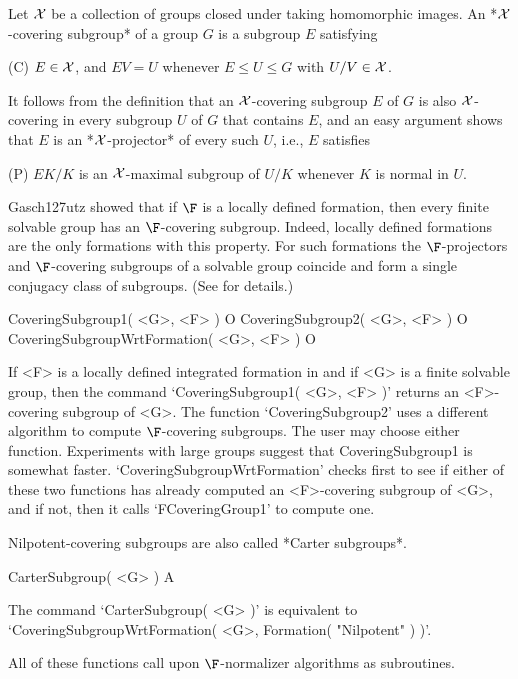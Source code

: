 
\def\X{{\cal{X}}}


Let $\X$ be a collection of groups closed under taking homomorphic images.
An *$\X$-covering subgroup* of a group $G$ is a subgroup $E$ satisfying

(C) \qquad $E \in \X$, and $EV = U$ whenever $E \le U \le G$ with $U/V \in
\X$.

It follows from the definition that an $\X$-covering subgroup $E$ of $G$ is
also $\X$-covering in every subgroup $U$ of $G$ that contains $E$, and an
easy argument shows that $E$ is an *$\X$-projector* of every such $U$,
i.e., $E$ satisfies

(P) \qquad $EK/K$ is an $\X$-maximal subgroup of $U/K$ whenever $K$ is
normal in $U$.

Gasch{\accent127u}tz showed that if $\F$ is a locally defined formation,
then every finite solvable group has an $\F$-covering subgroup. Indeed,
locally defined formations are the only formations with this property. For
such formations the $\F$-projectors and $\F$-covering subgroups of a
solvable group coincide and form a single conjugacy class of subgroups.
(See \cite{DH} for details.)

\> CoveringSubgroup1( <G>, <F> ) O
\> CoveringSubgroup2( <G>, <F> ) O
\> CoveringSubgroupWrtFormation( <G>, <F> ) O

If <F> is a locally defined integrated formation in {\GAP} and if <G> is
a finite solvable group, then the command `CoveringSubgroup1( <G>, <F> )'
returns an <F>-covering subgroup of <G>.
The function `CoveringSubgroup2' uses a different algorithm to compute
$\F$-covering subgroups. The user may choose either function. Experiments with large groups suggest that CoveringSubgroup1 is somewhat faster.
`CoveringSubgroupWrtFormation' checks first to see if either of these
two functions has already computed an <F>-covering subgroup of <G>, and if
not, then it  calls `FCoveringGroup1' to compute one. 

\medskip
Nilpotent-covering subgroups are also called *Carter subgroups*.

\> CarterSubgroup( <G> ) A

The command `CarterSubgroup( <G> )' is equivalent to 
`CoveringSubgroupWrtFormation( <G>, Formation( "Nilpotent" ) )'.

\medskip
All of these functions call upon $\F$-normalizer algorithms as subroutines.

